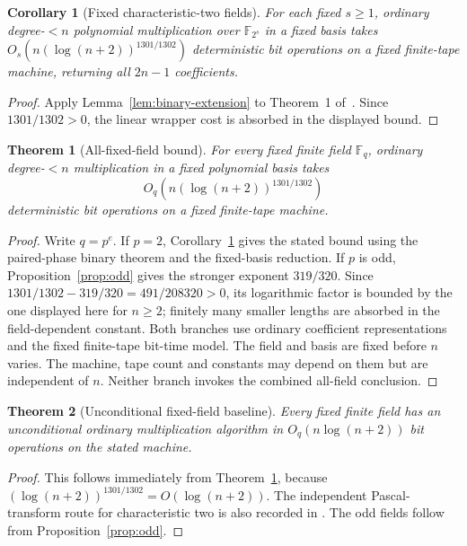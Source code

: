 \documentclass[11pt]{article}
\newtheorem{theorem}{Theorem}
\newtheorem{corollary}{Corollary}
\theoremstyle{definition}
\newcommand{\F}{\mathbb F}
\begin{document}
\begin{corollary}[Fixed characteristic-two fields]
\label{cor:paired-phase-extension}
For each fixed $s\ge1$, ordinary degree-$<n$ polynomial multiplication
over $\F_{2^s}$ in a fixed basis takes
$O_s(n(\log(n+2))^{1301/1302})$ deterministic bit operations on a
fixed finite-tape machine, returning all $2n-1$ coefficients.
\end{corollary}
\begin{proof}
Apply Lemma~\ref{lem:binary-extension} to Theorem~1
of~\cite{PairedPhase}. Since $1301/1302>0$, the linear wrapper cost
is absorbed in the displayed bound.
\end{proof}

\begin{theorem}[All-fixed-field bound]
\label{thm:all-fields}
For every fixed finite field $\F_q$, ordinary degree-$<n$
multiplication in a fixed polynomial basis takes
\[
 O_q\!\left(n(\log(n+2))^{1301/1302}\right)
\]
deterministic bit operations on a fixed finite-tape machine.
\end{theorem}
\begin{proof}
Write $q=p^e$. If $p=2$, Corollary~\ref{cor:paired-phase-extension}
gives the stated bound using the paired-phase binary theorem and
the fixed-basis reduction.
If $p$ is odd, Proposition~\ref{prop:odd} gives the stronger exponent
$319/320$. Since
$1301/1302-319/320=491/208320>0$, its logarithmic factor is bounded by the one
displayed here for $n\ge2$; finitely many smaller lengths are absorbed
in the field-dependent constant. Both branches use ordinary
coefficient representations and the fixed finite-tape bit-time model.
The field and basis are fixed before $n$ varies. The machine, tape
count and constants may depend on them but are independent of $n$.
Neither branch invokes the combined all-field conclusion.
\end{proof}

\begin{theorem}[Unconditional fixed-field baseline]
\label{thm:baseline}
Every fixed finite field has an unconditional ordinary multiplication
algorithm in $O_q(n\log(n+2))$ bit operations on the stated machine.
\end{theorem}
\begin{proof}
This follows immediately from Theorem~\ref{thm:all-fields}, because
$(\log(n+2))^{1301/1302}=O(\log(n+2))$. The independent Pascal-transform
route for characteristic two is also recorded in
\cite{SimpleBinary}. The odd fields follow from Proposition~\ref{prop:odd}.
\end{proof}
\end{document}
